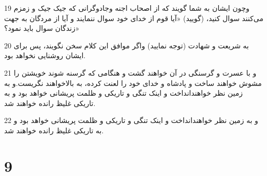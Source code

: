 \par 19 وچون ایشان به شما گویند که از اصحاب اجنه وجادوگرانی که جیک جیک و زمزم می‌کنند سوال کنید، (گویید) «آیا قوم از خدای خود سوال ننمایند و آیا از مردگان به جهت زندگان سوال باید نمود؟»
\par 20 به شریعت و شهادت (توجه نمایید) واگر موافق این کلام سخن نگویند، پس برای ایشان روشنایی نخواهد بود.
\par 21 و با عسرت و گرسنگی در آن خواهند گشت و هنگامی که گرسنه شوند خویشتن را مشوش خواهند ساخت و پادشاه و خدای خود را لعنت کرده، به بالاخواهند نگریست.و به زمین نظر خواهندانداخت و اینک تنگی و تاریکی و ظلمت پریشانی خواهد بود و به تاریکی غلیظ رانده خواهند شد.
\par 22 و به زمین نظر خواهندانداخت و اینک تنگی و تاریکی و ظلمت پریشانی خواهد بود و به تاریکی غلیظ رانده خواهند شد.
 
\chapter{9}


